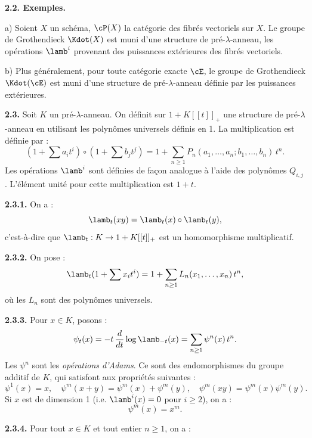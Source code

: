 \smallskip
\noindent\textbf{2.2. Exemples.}

\noindent a) Soient $X$ un sch\'ema, $\cP(X)$ la cat\'egorie des fibr\'es vectoriels sur $X$. Le groupe de Grothendieck $\Kdot(X)$ est muni d'une structure de pr\'e-$\lambda$-anneau, les op\'erations $\lamb^i$ provenant des puissances ext\'erieures des fibr\'es vectoriels.

\noindent b) Plus g\'en\'eralement, pour toute cat\'egorie exacte $\cE$, le groupe de Grothendieck $\Kdot(\cE)$ est muni d'une structure de pr\'e-$\lambda$-anneau d\'efinie par les puissances ext\'erieures.

\smallskip
\noindent\textbf{2.3.} Soit $K$ un pr\'e-$\lambda$-anneau. On d\'efinit sur $1 + K[[t]]_+$ une structure de pr\'e-$\lambda$-anneau en utilisant les polyn\^omes universels d\'efinis en 1. La multiplication est d\'efinie par :
\begin{equation}
(1 + \sum a_i t^i) \circ (1 + \sum b_j t^j) = 1 + \sum_{n \geq 1} P_n(a_1, \ldots, a_n; b_1, \ldots, b_n) \, t^n.
\end{equation}
Les op\'erations $\lamb^i$ sont d\'efinies de fa\c con analogue \`a l'aide des polyn\^omes $Q_{i,j}$. L'\'el\'ement unit\'e pour cette multiplication est $1 + t$.

\smallskip
\noindent\textbf{2.3.1.} On a :
\begin{equation}
\lamb_t(xy) = \lamb_t(x) \circ \lamb_t(y),
\end{equation}
c'est-\`a-dire que $\lamb_t : K \to 1 + K[[t]]_+$ est un homomorphisme multiplicatif.

\smallskip
\noindent\textbf{2.3.2.} On pose :
\begin{equation}
\lamb_t(1 + \sum x_i t^i) = 1 + \sum_{n \geq 1} L_n(x_1, \ldots, x_n) \, t^n,
\end{equation}
o\`u les $L_n$ sont des polyn\^omes universels.

\smallskip
\noindent\textbf{2.3.3.} Pour $x \in K$, posons :
\begin{equation}
\psi_t(x) = -t \, \frac{d}{dt} \log \lamb_{-t}(x) = \sum_{n \geq 1} \psi^n(x) \, t^n.
\end{equation}
Les $\psi^n$ sont les \emph{op\'erations d'Adams}. Ce sont des endomorphismes du groupe additif de $K$, qui satisfont aux propri\'et\'es suivantes :
\begin{equation}
\psi^1(x) = x, \quad \psi^m(x+y) = \psi^m(x) + \psi^m(y), \quad \psi^m(xy) = \psi^m(x)\psi^m(y).
\end{equation}
Si $x$ est de dimension 1 (i.e. $\lamb^i(x) = 0$ pour $i \geq 2$), on a :
\begin{equation}
\psi^m(x) = x^m.
\end{equation}

\smallskip
\noindent\textbf{2.3.4.} Pour tout $x \in K$ et tout entier $n \geq 1$, on a :
